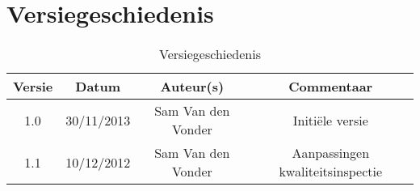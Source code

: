 \chapter{Versiegeschiedenis}

\begin{table}[htbp]
	\centering
	\caption{Versiegeschiedenis}
	\begin{tabular} {|c|c|c|c|}
	    \hline
		\textbf{Versie} & \textbf{Datum} 	& \textbf{Auteur(s)} & \textbf{Commentaar} \\
		\hline
		1.0	& 30/11/2013	& Sam Van den Vonder & Initi\"{e}le versie \\ \hline
		1.1 & 10/12/2012	& Sam Van den Vonder & Aanpassingen kwaliteitsinspectie \\ \hline
	\end{tabular}
\end{table}